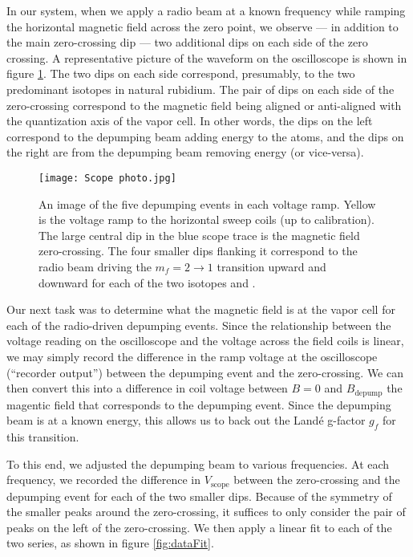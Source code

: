 \documentclass[letter]{article}
\begin{document}
In our system, when we apply a radio beam at a known frequency while ramping the horizontal magnetic field across the zero point, we observe --- in addition to the main zero-crossing dip --- two additional dips on each side of the zero crossing. A representative picture of the waveform on the oscilloscope is shown in figure \ref{fig:scopeImage}. The two dips on each side correspond, presumably, to the two predominant isotopes in natural rubidium. The pair of dips on each side of the zero-crossing correspond to the magnetic field being aligned or anti-aligned with the quantization axis of the vapor cell. In other words, the dips on the left correspond to the depumping beam adding energy to the atoms, and the dips on the right are from the depumping beam removing energy (or vice-versa).

\begin{figure}[h] \centering
	\texttt{[image: Scope photo.jpg]}
	\caption{An image of the five depumping events in each voltage ramp. Yellow is the voltage ramp to the horizontal sweep coils (up to calibration). The large central dip in the blue scope trace is the magnetic field zero-crossing. The four smaller dips flanking it correspond to the radio beam driving the $m_f=2 \to 1$ transition upward and downward for each of the two isotopes  and .}
	\label{fig:scopeImage}
\end{figure}

Our next task was to determine what the magnetic field is at the vapor cell for each of the radio-driven depumping events. Since the relationship between the voltage reading on the oscilloscope and the voltage across the field coils is linear, we may simply record the difference in the ramp voltage at the oscilloscope (``recorder output'') between the depumping event and the zero-crossing. We can then convert this into a difference in coil voltage between $B=0$ and $B_{\text{depump}}$ the magentic field that corresponds to the depumping event. Since the depumping beam is at a known energy, this allows us to back out the Land{\'e} g-factor $g_f$ for this transition.

To this end, we adjusted the depumping beam to various frequencies. At each frequency, we recorded the difference in $V_{\text{scope}}$ between the zero-crossing and the depumping event for each of the two smaller dips. Because of the symmetry of the smaller peaks around the zero-crossing, it suffices to only consider the pair of peaks on the left of the zero-crossing. We then apply a linear fit to each of the two series, as shown in figure \ref{fig:dataFit}.
\end{document}
